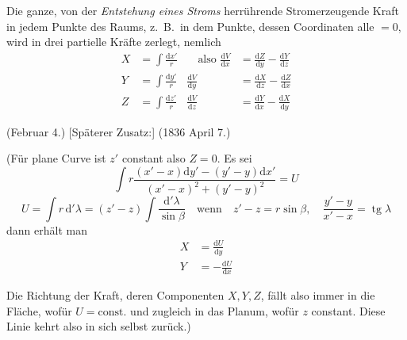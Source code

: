 \vspace{4mm}
Die ganze, von der \textit{Entstehung eines Stroms} herrührende Stromerzeugende Kraft in jedem Punkte des Raums, z.\ B.\ in dem Punkte, dessen Coordinaten alle $=0$, wird in drei partielle Kräfte zerlegt, nemlich
\[
\begin{aligned}
X&=\int\frac{\mathrm dx'}{r}&\quad\text{also }\frac{\mathrm dV}{\mathrm dx}&=\frac{\mathrm dZ}{\mathrm dy}-\frac{\mathrm dY}{\mathrm dz}\\[4pt]
Y&=\int\frac{\mathrm dy'}{r}&\frac{\mathrm dV}{\mathrm dy}&=\frac{\mathrm dX}{\mathrm dz}-\frac{\mathrm dZ}{\mathrm dx}\\[4pt]
Z&=\int\frac{\mathrm dz'}{r}&\frac{\mathrm dV}{\mathrm dz}&=\frac{\mathrm dY}{\mathrm dx}-\frac{\mathrm dX}{\mathrm dy}
\end{aligned}
\]

(Februar 4.) [Späterer Zusatz:] (1836 April 7.)

(Für plane Curve ist $z'$ constant also $Z=0$. Es sei
\[
\int r\frac{(x'-x)\mathrm dy'-(y'-y)\mathrm dx'}{(x'-x)^2+(y'-y)^2}=U
\]
\[
U=\int r\,\mathrm d'\lambda=(z'-z)\int\frac{\mathrm d'\lambda}{\sin\beta}\quad\text{wenn}\quad z'-z=r\sin\beta,\quad\frac{y'-y}{x'-x}=\operatorname{tg}\lambda
\]
dann erhält man
\[
\begin{aligned}
X&=\frac{\mathrm dU}{\mathrm dy}\\[4pt]
Y&=-\frac{\mathrm dU}{\mathrm dx}
\end{aligned}
\]

Die Richtung der Kraft, deren Componenten $X,Y,Z$, fällt also immer in die Fläche, wofür $U=\text{const.}$ und zugleich in das Planum, wofür $z$ constant. Diese Linie kehrt also in sich selbst zurück.)

